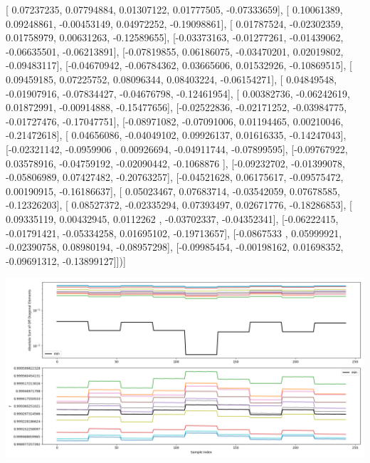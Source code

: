 \documentclass{article}
\begin{document}
       [ 0.07237235,  0.07794884,  0.01307122,  0.01777505, -0.07333659],
       [ 0.10061389,  0.09248861, -0.00453149,  0.04972252, -0.19098861],
       [ 0.01787524, -0.02302359,  0.01758979,  0.00631263, -0.12589655],
       [-0.03373163, -0.01277261, -0.01439062, -0.06635501, -0.06213891],
       [-0.07819855,  0.06186075, -0.03470201,  0.02019802, -0.09483117],
       [-0.04670942, -0.06784362,  0.03665606,  0.01532926, -0.10869515],
       [ 0.09459185,  0.07225752,  0.08096344,  0.08403224, -0.06154271],
       [ 0.04849548, -0.01907916, -0.07834427, -0.04676798, -0.12461954],
       [ 0.00382736, -0.06242619,  0.01872991, -0.00914888, -0.15477656],
       [-0.02522836, -0.02171252, -0.03984775, -0.01727476, -0.17047751],
       [-0.08971082, -0.07091006,  0.01194465,  0.00210046, -0.21472618],
       [ 0.04656086, -0.04049102,  0.09926137,  0.01616335, -0.14247043],
       [-0.02321142, -0.0959906 ,  0.00926694, -0.04911744, -0.07899595],
       [-0.09767922,  0.03578916, -0.04759192, -0.02090442, -0.1068876 ],
       [-0.09232702, -0.01399078, -0.05806989,  0.07427482, -0.20763257],
       [-0.04521628,  0.06175617, -0.09575472,  0.00190915, -0.16186637],
       [ 0.05023467,  0.07683714, -0.03542059,  0.07678585, -0.12326203],
       [ 0.08527372, -0.02335294,  0.07393497,  0.02671776, -0.18286853],
       [ 0.09335119,  0.00432945,  0.0112262 , -0.03702337, -0.04352341],
       [-0.06222415, -0.01791421, -0.05334258,  0.01695102, -0.19713657],
       [-0.0867533 ,  0.05999921, -0.02390758,  0.08980194, -0.08957298],
       [-0.09985454, -0.00198162,  0.01698352, -0.09691312, -0.13899127]])]
\begin{center}
\includegraphics[scale=.9]{report_pickled_controls250/control_dpn_all.png}

\end{center}
\end{document}
